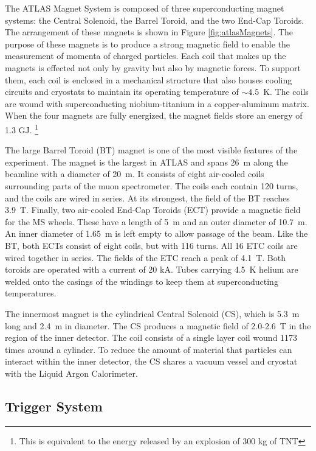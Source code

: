 The ATLAS Magnet System is composed of three superconducting magnet systems: the Central Solenoid, the Barrel Toroid, and the two End-Cap Toroids.
The arrangement of these magnets is shown in Figure \ref{fig:atlasMagnets}.
The purpose of these magnets is to produce a strong magnetic field to enable the measurement of momenta of charged particles.
Each coil that makes up the magnets is effected not only by gravity but also by magnetic forces.
To support them, each coil is enclosed in a mechanical structure that also houses cooling circuits and cryostats to maintain its operating temperature of $\sim4.5$~K.
The coils are wound with superconducting niobium-titanium in a copper-aluminum matrix.
When the four magnets are fully energized, the magnet fields store an energy of 1.3 GJ. \footnote{This is equivalent to the energy released by an explosion of 300 kg of TNT}

The large Barrel Toroid (BT) magnet is one of the most visible features of the experiment.
The magnet is the largest in ATLAS and spans 26~m along the beamline with a diameter of 20~m.
It consists of eight air-cooled coils surrounding parts of the muon spectrometer.
The coils each contain 120 turns, and the coils are wired in series.
At its strongest, the field of the BT reaches 3.9~T.
Finally, two air-cooled End-Cap Toroids (ECT) provide a magnetic field for the MS wheels.
These have a length of 5~m and an outer diameter of 10.7~m. An inner diameter of 1.65~m is left empty to allow passage of the beam.
Like the BT, both ECTs consist of eight coils, but with 116 turns.
All 16 ETC coils are wired together in series.
The fields of the ETC reach a peak of 4.1~T.
Both toroids are operated with a current of 20 kA.
Tubes carrying 4.5~K helium are welded onto the casings of the windings to keep them at superconducting temperatures.

The innermost magnet is the cylindrical Central Solenoid (CS), which is 5.3~m long and 2.4~m in diameter.
The CS produces a magnetic field of 2.0-2.6~T in the region of the inner detector.
The coil consists of a single layer coil wound 1173 times around a cylinder.
To reduce the amount of material that particles can interact within the inner detector, the CS shares a vacuum vessel and cryostat with the Liquid Argon Calorimeter.
\cite{atlasFacts}
\cite{magnetTdr}

\subsection{Trigger System}

